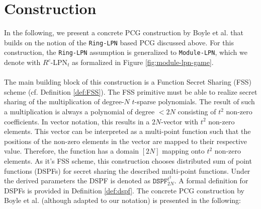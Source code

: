 \section{Construction}
\label{sec:construction}
In the following, we present a concrete PCG construction by Boyle et al. \cite{boyle2020efficient} that builds on the notion of the \texttt{Ring-LPN} based PCG discussed above. For this construction, the \texttt{Ring-LPN} assumption is generalized to \texttt{Module-LPN}, which we denote with $R^{c}$-LPN$_{t}$ as formalized in Figure \ref{fig:module-lpn-game}. 
\\\\
The main building block of this construction is a Function Secret Sharing (FSS) scheme (cf. Definition \ref{def:FSS}). The FSS primitive must be able to realize secret sharing of the multiplication of degree-$N$ $t$-sparse polynomials. The result of such a multiplication is always a polynomial of degree $< 2N$ consisting of $t^2$ non-zero coefficients. In vector notation, this results in a $2N$-vector with $t^2$ non-zero elements. This vector can be interpreted as a multi-point function such that the positions of the non-zero elements in the vector are mapped to their respective value. Therefore, the function has a domain $[2N]$ mapping onto $t^2$ non-zero elements. As it's FSS scheme, this construction chooses distributed sum of point functions (DSPFs) for secret sharing the described multi-point functions. Under the derived parameters the DSPF is denoted as $\texttt{DSPF}^{t^2}_{2N}$. A formal definition for DSPFs is provided in Definition \ref{def:dspf}. The concrete PCG construction by Boyle et al. \cite{boyle2020efficient} (although adapted to our notation) is presented in the following:

